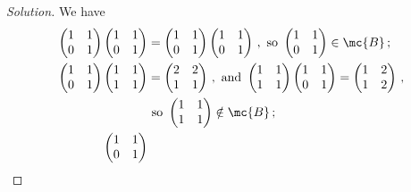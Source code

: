 \begin{proof}[Solution]
	We have
	\begin{align*}
		\begin{pmatrix}
			1 & 1 \\
			0 & 1
		\end{pmatrix}
		\begin{pmatrix}
			1 & 1 \\
			0 & 1
		\end{pmatrix}
		&=
		\begin{pmatrix}
			1 & 1 \\
			0 & 1
		\end{pmatrix}
		\begin{pmatrix}
			1 & 1 \\
			0 & 1
		\end{pmatrix}\,,
		\text{ so }	
		\begin{pmatrix}
			1 & 1 \\
			0 & 1
		\end{pmatrix}
		\in \mc{B}\,;
		\\
		\begin{pmatrix}
			1 & 1 \\
			0 & 1
		\end{pmatrix}
		\begin{pmatrix}
			1 & 1 \\
			1 & 1
		\end{pmatrix}
		&=
		\begin{pmatrix}
			2 & 2 \\
			1 & 1
		\end{pmatrix}\,,
		\text{ and }
		\begin{pmatrix}
			1 & 1 \\
			1 & 1
		\end{pmatrix}
		\begin{pmatrix}
			1 & 1 \\
			0 & 1
		\end{pmatrix}
		=
		\begin{pmatrix}
			1 & 2 \\
			1 & 2
		\end{pmatrix}\,,
		\\
		&\text{ so }
		\begin{pmatrix}
			1 & 1 \\
			1 & 1
		\end{pmatrix}
		\notin \mc{B}\,;
		\\
		\begin{pmatrix}
			1 & 1 \\
			0 & 1
		\end{pmatrix}

\end{align*}
\end{proof}
